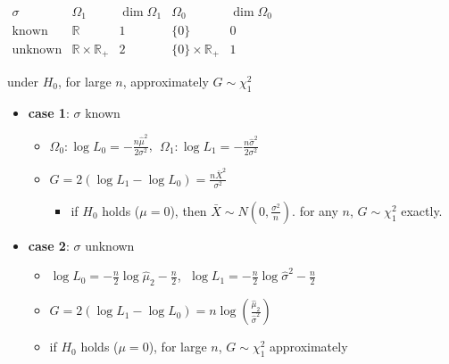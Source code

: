 \documentclass[10pt, landscape]{article}
\newcommand{\Xbar}{\bar{X}}
\begin{document}
\begin{multicols*}{4}
  $ \begin{array}{c|c|c|c|c}
    \sigma & \Omega_1 & \dim\Omega_1 & \Omega_0 & \dim\Omega_0 \\\hline
    \text{known} & \mathbb{R} & 1 & \{0\} & 0 \\
    \text{unknown} & \mathbb{R}\times \mathbb{R}_+ & 2 & \{0\} \times \mathbb{R}_+ & 1
  \end{array} $

  under $H_0$, for large $n$, approximately $G \sim \chi^2_1$

  \begin{itemize}
    \item \textbf{case 1}: $\sigma$ known
      \begin{itemize}
        \item $\Omega_0 : \log L_0 = -\frac{n\hat\mu^2}{2\sigma^2}$, 
          $\;\Omega_1 : \log L_1 = -\frac{n\hat\sigma^2}{2\sigma^2}$
        \item $G = 2(\log L_1 - \log L_0) = \frac{n\Xbar^2}{\sigma^2}$
          \begin{itemize}
            \item if $H_0$ holds ($\mu = 0$), then $\Xbar \sim N(0, \frac{\sigma^2}{n})$. 
              for any $n$, $G \sim \chi^2_1$ exactly.
          \end{itemize}
      \end{itemize}

    \item \textbf{case 2}: $\sigma$ unknown
      \begin{itemize}
        \item $\log L_0 = -\frac{n}{2} \log \hat\mu_2 - \frac{n}{2}$, $\;\log L_1 = -\frac{n}{2} \log \hat\sigma^2 - \frac{n}{2}$
        \item $G = 2(\log L_1 - \log L_0) = n\log ( \frac{\hat\mu_2}{\hat\sigma^2} )$
        \item if $H_0$ holds ($\mu = 0$), for large $n$, $G \sim \chi^2_1$ approximately
      \end{itemize}
  \end{itemize}




\end{multicols*}
\end{document}
